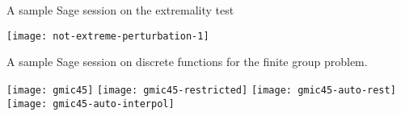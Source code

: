 \documentclass[10pt,reqno]{amsart}
\begin{document}
\setcounter{table}{2}
\begin{table}[h]
  \caption{A sample Sage session on the extremality test}
  \label{tab:extremality_test}
  {\texttt{[image: not-extreme-perturbation-1]}}
\end{table}

\begin{table}[h]
  \caption{A sample Sage session on discrete functions for the finite group problem.}
  \label{tab:discrete-funtions}
  \texttt{[image: gmic45]}
  \texttt{[image: gmic45-restricted]}
  \texttt{[image: gmic45-auto-rest]}
  \texttt{[image: gmic45-auto-interpol]}
\end{table}
\end{document}

